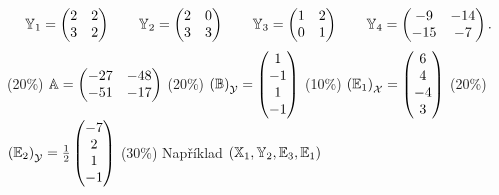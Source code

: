 \documentclass{article}
\newcommand{\mathbasis}{\ensuremath{\mathcal}}
\newcommand{\mathmat}{\ensuremath{\mathbb}}
\begin{document}
\begin{Answer}[ref=bases]
	\[
		\mathmat{Y}_1 = \begin{pmatrix} 2 & 2 \\ 3 & 2 \end{pmatrix} \qquad
		\mathmat{Y}_2 = \begin{pmatrix} 2 & 0 \\ 3 & 3 \end{pmatrix} \qquad
		\mathmat{Y}_3 = \begin{pmatrix} 1 & 2 \\ 0 & 1 \end{pmatrix} \qquad
		\mathmat{Y}_4 = \begin{pmatrix} -9 & -14 \\ -15 & -7 \end{pmatrix} \text{.}
	\]
	\Question (20\%) \quad \( \mathmat{A} = \begin{pmatrix} -27 & -48 \\ -51 & -17 \end{pmatrix} \)
	\Question (20\%) \quad \( \left( \mathmat{B} \right)_\mathbasis{Y} = \begin{pmatrix} 1 \\ -1 \\ 1 \\ -1 \end{pmatrix} \)
	\Question (10\%) \quad \( \left( \mathmat{E}_1 \right)_\mathbasis{X} = \begin{pmatrix} 6 \\ 4 \\ -4 \\ 3 \end{pmatrix} \)
	\Question (20\%) \quad \( \left( \mathmat{E}_2 \right)_\mathbasis{Y} = \frac{1}{2} \begin{pmatrix} -7 \\ 2 \\ 1 \\ -1 \end{pmatrix} \)
	\Question (30\%) \quad Například \( \left( \mathmat{X}_1, \mathmat{Y}_2, \mathmat{E}_3, \mathmat{E}_1 \right) \)
\end{Answer}

\newpage
\end{document}
